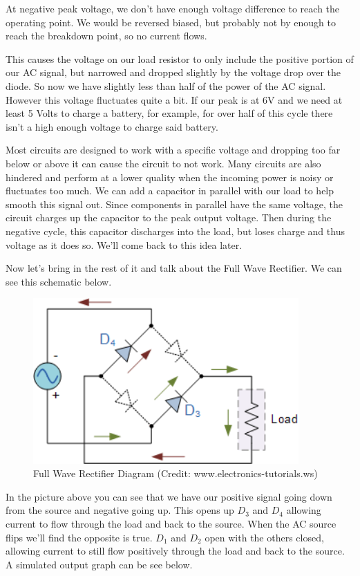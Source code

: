 \documentclass[prb,preprint]{revtex4-1}
\begin{document}
At negative peak voltage, we don't have enough voltage difference to reach the operating point. We would be reversed biased, but probably not by enough to reach the breakdown point, so no current flows.

This causes the voltage on our load resistor to only include the positive portion of our AC signal, but narrowed and dropped slightly by the voltage drop over the diode. So now we have slightly less than half of the power of the AC signal. However this voltage fluctuates quite a bit. If our peak is at 6V and we need at least 5 Volts to charge a battery, for example, for over half of this cycle there isn't a high enough voltage to charge said battery.

Most circuits are designed to work with a specific voltage and dropping too far below or above it can cause the circuit to not work. Many circuits are also hindered and perform at a lower quality when the incoming power is noisy or fluctuates too much. We can add a capacitor in parallel with our load to help smooth this signal out. Since components in parallel have the same voltage, the circuit charges up the capacitor to the peak output voltage. Then during the negative cycle, this capacitor discharges into the load, but loses charge and thus voltage as it does so. We'll come back to this idea later.

Now let's bring in the rest of it and talk about the Full Wave Rectifier. We can see this schematic below.

\begin{figure}[ht]
	\centering
	\includegraphics[width=4in]{fwr.png}
	\caption{Full Wave Rectifier Diagram (Credit: www.electronics-tutorials.ws)}
	\label{fig1}
\end{figure}

In the picture above you can see that we have our positive signal going down from the source and negative going up. This opens up $D_{3}$ and $D_{4}$ allowing current to flow through the load and back to the source.
When the AC source flips we'll find the opposite is true. $D_{1}$ and $D_{2}$ open with the others closed, allowing current to still flow positively through the load and back to the source. A simulated output graph can be see below.
\end{document}
